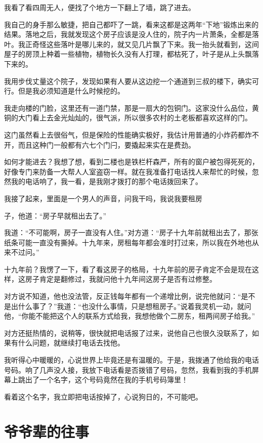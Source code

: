 我看了看四周无人，便找了个地方一下翻上了墙，跳了进去。

我自己的身手那么敏捷，把自己都吓了一跳，看来这都是这两年“下地”锻炼出来的结果。落地之后，我就发现这个房子应该是没人住的，院子内一片萧条，全都是落叶。我正奇怪这些落叶是哪儿来的，就又见几片飘了下来。我一抬头就看到，这间屋子的房顶上种着一些植物，植物长久没有人打理，都枯死了，叶子是从上头飘落下来的。

我用步伐丈量这个院子，发现如果有人要从这边挖一个通道到三叔的楼下，确实可行。但是我必须知道是什么时候挖的。

我走向楼的门脸，这里还有一道门禁，那是一扇大的包铜门。这家没什么品位，黄铜的大门看上去金光灿灿的，很气派，所以很多农村的土老板都喜欢这样的门。

这门虽然看上去很俗气，但是保险的性能确实极好，我估计用普通的小炸药都炸不开，而且这种门一般都有六七个门闩，要撬起来实在是费劲。

如何才能进去？我想了想，看到二楼也是铁栏杆森严，所有的窗户被包得死死的，好像专门来防备一大帮人人室盗窃一样。就在我准备打电话找人来帮忙的时候，忽然我的电话响了，我一看，是我刚才拨打的那个电话拨回来了。

我接了起来，里面是一个男人的声音，问我干吗，我说我要租房

子，他道：“房子早就租出去了。”

我道：“不可能啊，房子一直没有人住。”对方道：“房子十九年前就租出去了，那张纸条可能一直没有撕掉。十九年来，房租每年都会准时打过来，所以我在外地也从来不过问。”

十九年前？我愣了一下，看了看这房子的格局，十九年前的房子肯定不会是现在这样，这房子肯定是翻修过，我就问他十九年间这房子是否有过修整。

对方说不知道，他也没法管，反正钱每年都有一个递增比例，说完他就问：“是不是出什么事了？”我道：“也没什么事情，只是想租房子。”说着我灵机一动，就问他，“你能不能把这个人的联系方式给我，我想他做个二房东，租两间房子给我。”

对方还挺热情的，说稍等，很快就把电话报了过来，说他自己也很久没联系了，如果有什么问题，就继续打电话去找他。

我听得心中暖暖的，心说世界上毕竟还是有温暖的。于是，我拨通了他给我的电话号码。响了几声没人接，我放下电话看是否拨错了号码，忽然，我看到我的手机屏幕上跳出了一个名字，这个号码竟然在我的手机号码簿里！

看着这个名字，我立即把电话按掉了，心说狗日的，不可能吧。

\chapter{爷爷辈的往事}

